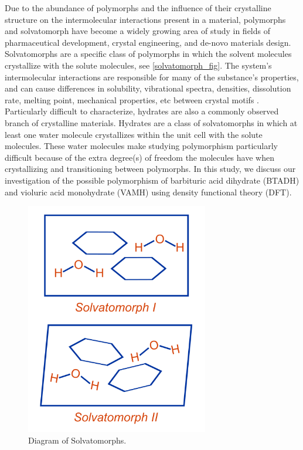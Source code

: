 Due to the abundance of polymorphs and the influence of their crystalline structure on the intermolecular interactions present in a material, polymorphs and solvatomorph have become a widely growing area of study in fields of pharmaceutical development, crystal engineering, and de-novo materials design. Solvatomorphs are a specific class of polymorphs in which the solvent molecules crystallize with the solute molecules, see \autoref{solvatomorph_fig}. The system's intermolecular interactions are responsible for many of the substance’s properties, and can cause differences in solubility, vibrational spectra, densities, dissolution rate, melting point, mechanical properties, etc between crystal motifs \citep{Brittain2016,bernstein_polymorphism_2011,gentili_polymorphism_2019, Hoja}. Particularly difficult to characterize, hydrates are also a commonly observed branch of crystalline materials. Hydrates are a class of solvatomorphs in which at least one water molecule crystallizes within the unit cell with the solute molecules. These water molecules make studying polymorphism particularly difficult because of the extra degree(s) of freedom the molecules have when crystallizing and transitioning between polymorphs. In this study, we discuss our investigation of the possible polymorphism of barbituric acid dihydrate (BTADH) and violuric acid monohydrate (VAMH) using density functional theory (DFT). 
\begin{figure}[ht]
    \centering
    \includegraphics[width=8cm]{src/figures/intro_figs/solvatomorphs.png}
    \caption{Diagram of Solvatomorphs.}
    \label{solvatomorph_fig}
\end{figure}
